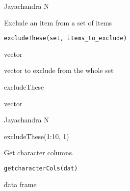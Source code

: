 \documentclass[a4paper]{book}
\begin{document}
%
\begin{Author}\relax
Jayachandra N
\end{Author}
%
\begin{Examples}
\end{Examples}
%
\begin{Description}\relax
Exclude an item from a set of items
\end{Description}
%
\begin{Usage}
\begin{verbatim}
excludeThese(set, items_to_exclude)
\end{verbatim}
\end{Usage}
%
\begin{Arguments}
\begin{ldescription}
\item[\code{set}] vector

\item[\code{items\_to\_exclude}] vector to exclude from the whole set
\end{ldescription}
\end{Arguments}
%
\begin{Details}\relax
excludeThese
\end{Details}
%
\begin{Value}
vector
\end{Value}
%
\begin{Author}\relax
Jayachandra N
\end{Author}
%
\begin{Examples}
\begin{ExampleCode}
excludeThese(1:10, 1)
\end{ExampleCode}
\end{Examples}
%
\begin{Description}\relax
Get character columns.
\end{Description}
%
\begin{Usage}
\begin{verbatim}
getcharacterCols(dat)
\end{verbatim}
\end{Usage}
%
\begin{Arguments}
\begin{ldescription}
\item[\code{dat}] data frame
\end{ldescription}
\end{Arguments}
\end{document}
